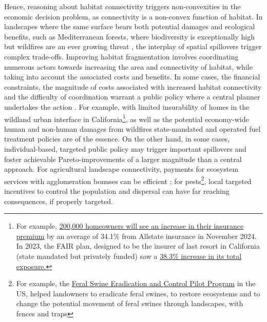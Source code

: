 	 Hence, reasoning about habitat connectivity triggers non-convexities in the economic decision problem, as connectivity is a non-convex function of habitat. In landscapes where the same surface bears both potential damages and ecological benefits, such as Mediterranean forests, where biodiversity is exceptionally high but wildfires are an ever growing threat \citep{Dupuy2019ClimateCI, wasserman_climate_2023}, the interplay of spatial spillovers trigger complex trade-offs. 
	 Improving habitat fragmentation involves coordinating numerous actors towards increasing the area and connectivity of habitat, while taking into account the associated costs and benefits. In some cases, the financial constraints, the magnitude of costs associated with increased habitat connectivity and the difficulty of coordination warrant a public policy where a central planner undertakes the action \citep{Mouysset2012}. For example, with limited insurability of homes in the wildland urban interface in California\footnote{For example, \href{https://www.washingtonpost.com/climate-environment/2024/08/29/california-insurance-wildfires-allstate/}{200,000 homeowners will see an increase in their insurance premium} by an average of 34.1\% from Allstate insurance in November 2024. In 2023, the FAIR plan, designed to be the insurer of last resort in California (state mandated but privately funded) saw a \href{https://www.cfpnet.com/key-statistics-data/}{38.3\% increase in its total exposure.}}, as well as the potential economy-wide human and non-human damages from wildfires \citep{wang_economic_2021, heft-neal_behavior_2023, Ayars2023} state-mandated and operated fuel treatment policies are of the essence. On the other hand, in some cases, individual-based, targeted public policy may trigger important spillovers and foster achievable Pareto-improvements of a larger magnitude than a central approach. For agricultural landscape connectivity, payments for ecosystem services with agglomeration bonuses can be efficient \citep{bareille_agglomeration_2023}; for pests\footnote{For example, the \href{https://www.nrcs.usda.gov/group/143/feral-swine-eradication-and-control-pilot-program}{Feral Swine Eradication and Control Pilot Program} in the US, helped landowners to eradicate feral swines, to restore ecosystems and to change the potential movement of feral swines through landscapes, with fences and traps}, local targeted incentives to control the population and dispersal can have far reaching consequences, if properly targeted. 
	
